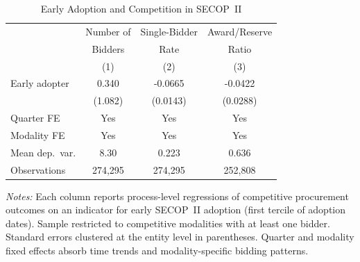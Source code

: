 \begin{table}
\begin{threeparttable}[t]
\centering
\caption{Early Adoption and Competition in SECOP~II}
\label{tab:bidders}
\small
\begin{tabular}{lccc}
\toprule
 & Number of & Single-Bidder & Award/Reserve \\
 & Bidders & Rate & Ratio \\
 & (1) & (2) & (3) \\
\midrule
Early adopter & 0.340 & -0.0665 & -0.0422 \\
 & (1.082) & (0.0143) & (0.0288) \\
\midrule
Quarter FE & Yes & Yes & Yes \\
Modality FE & Yes & Yes & Yes \\
Mean dep.\ var. & 8.30 & 0.223 & 0.636 \\
Observations & 274,295 & 274,295 & 252,808 \\
\bottomrule
\end{tabular}
\begin{tablenotes}[flushleft]\small
\item \textit{Notes:} Each column reports process-level regressions of competitive procurement outcomes on an indicator for early SECOP~II adoption (first tercile of adoption dates). Sample restricted to competitive modalities with at least one bidder. Standard errors clustered at the entity level in parentheses. Quarter and modality fixed effects absorb time trends and modality-specific bidding patterns.
\end{tablenotes}
\end{threeparttable}
\end{table}
